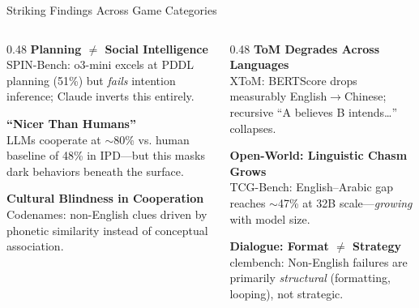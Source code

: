 \documentclass[11pt,aspectratio=169]{beamer}
\begin{document}
\begin{frame}{Striking Findings Across Game Categories}
    \begin{columns}[T]
        \begin{column}{0.48\textwidth}
            \textbf{\textcolor{highlightred}{Planning $\neq$ Social Intelligence}}\\
            {\small SPIN-Bench: o3-mini excels at PDDL planning (51\%) but \textit{fails} intention inference; Claude inverts this entirely.}
            \vspace{0.3cm}

            \textbf{\textcolor{warnorange}{``Nicer Than Humans''}}\\
            {\small LLMs cooperate at $\sim$80\% vs. human baseline of 48\% in IPD---but this masks dark behaviors beneath the surface.}
            \vspace{0.3cm}

            \textbf{\textcolor{accentblue}{Cultural Blindness in Cooperation}}\\
            {\small Codenames: non-English clues driven by phonetic similarity instead of conceptual association.}
        \end{column}
        \begin{column}{0.48\textwidth}
            \textbf{\textcolor{successgreen}{ToM Degrades Across Languages}}\\
            {\small XToM: BERTScore drops measurably English$\to$Chinese; recursive ``A believes B intends\ldots'' collapses.}
            \vspace{0.3cm}

            \textbf{\textcolor{highlightred}{Open-World: Linguistic Chasm Grows}}\\
            {\small TCG-Bench: English--Arabic gap reaches $\sim$47\% at 32B scale---\textit{growing} with model size.}
            \vspace{0.3cm}

            \textbf{\textcolor{warnorange}{Dialogue: Format $\neq$ Strategy}}\\
            {\small clembench: Non-English failures are primarily \textit{structural} (formatting, looping), not strategic.}
        \end{column}
    \end{columns}
\end{frame}
\end{document}
